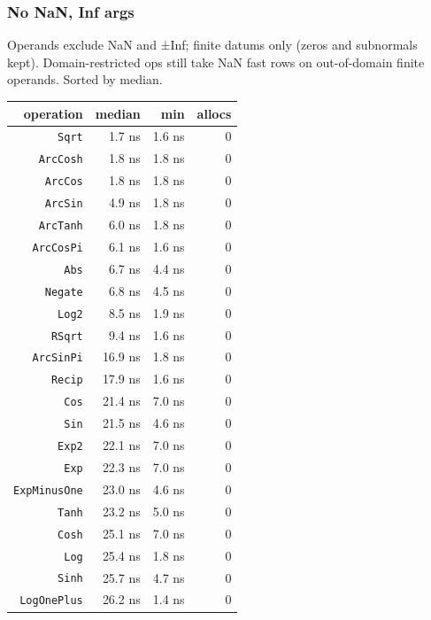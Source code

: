 \subsubsection{No NaN, Inf args}



\label{16036960291186107490}{}


Operands exclude NaN and ±Inf; finite datums only (zeros and subnormals kept). Domain-restricted ops still take NaN fast rows on out-of-domain finite operands. Sorted by median.




\begin{table}[h]
\centering
\begin{tabulary}{\linewidth}{R R R R}
\toprule
operation & median & min & allocs \\
\toprule
\texttt{Sqrt} & 1.7 ns & 1.6 ns & 0 \\
\texttt{ArcCosh} & 1.8 ns & 1.8 ns & 0 \\
\texttt{ArcCos} & 1.8 ns & 1.8 ns & 0 \\
\texttt{ArcSin} & 4.9 ns & 1.8 ns & 0 \\
\texttt{ArcTanh} & 6.0 ns & 1.8 ns & 0 \\
\texttt{ArcCosPi} & 6.1 ns & 1.6 ns & 0 \\
\texttt{Abs} & 6.7 ns & 4.4 ns & 0 \\
\texttt{Negate} & 6.8 ns & 4.5 ns & 0 \\
\texttt{Log2} & 8.5 ns & 1.9 ns & 0 \\
\texttt{RSqrt} & 9.4 ns & 1.6 ns & 0 \\
\texttt{ArcSinPi} & 16.9 ns & 1.8 ns & 0 \\
\texttt{Recip} & 17.9 ns & 1.6 ns & 0 \\
\texttt{Cos} & 21.4 ns & 7.0 ns & 0 \\
\texttt{Sin} & 21.5 ns & 4.6 ns & 0 \\
\texttt{Exp2} & 22.1 ns & 7.0 ns & 0 \\
\texttt{Exp} & 22.3 ns & 7.0 ns & 0 \\
\texttt{ExpMinusOne} & 23.0 ns & 4.6 ns & 0 \\
\texttt{Tanh} & 23.2 ns & 5.0 ns & 0 \\
\texttt{Cosh} & 25.1 ns & 7.0 ns & 0 \\
\texttt{Log} & 25.4 ns & 1.8 ns & 0 \\
\texttt{Sinh} & 25.7 ns & 4.7 ns & 0 \\
\texttt{LogOnePlus} & 26.2 ns & 1.4 ns & 0 \\

\end{tabulary}
\end{table}
